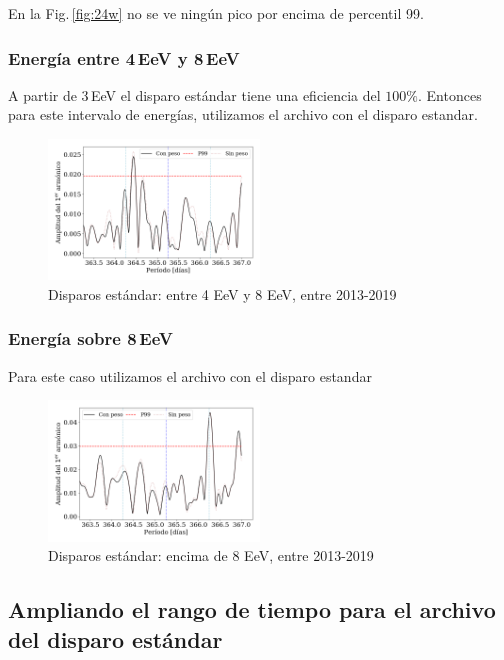 En la Fig.\,\ref{fig:24w} no se ve ningún pico por encima de  percentil 99.


\subsubsection{Energía entre 4\,EeV y 8\,EeV}

A partir de $3\,$EeV el disparo estándar tiene una eficiencia del $100\%$. Entonces para este  intervalo de energías,  utilizamos el archivo con el disparo estandar.

\begin{figure}[H]
	\centering
	\includegraphics[width=0.5\textwidth]{Graficos/2019_Main_Array_4_8_EeV_con_vs_sin_peso.png}
	\caption{Disparos estándar: entre 4 EeV y 8 EeV, entre 2013-2019}
	\label{fig:48w}
\end{figure}

\subsubsection{Energía sobre 8\,EeV}

Para este caso utilizamos el archivo con el disparo estandar

\begin{figure}[H]
	\centering
	\includegraphics[width=0.5\textwidth]{Graficos/2019_Main_Array_8_EeV_con_vs_sin_peso.png}
	\caption{Disparos estándar: encima de 8 EeV, entre 2013-2019}
	\label{fig:8w}
\end{figure}




\subsection{Ampliando el rango de tiempo para el archivo del disparo estándar}

